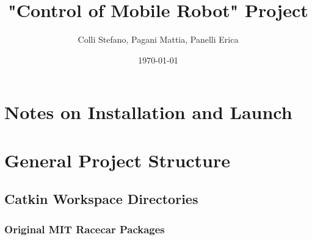 \documentclass[12pt, letterpaper, oneside]{report}
\title{"Control of Mobile Robot" Project}
\author{Colli Stefano, Pagani Mattia, Panelli Erica}
\date{\today}
\begin{document}
	
\maketitle

\begin{abstract}
\end{abstract}

\tableofcontents

\newpage

%

\chapter{Notes on Installation and Launch}

\chapter{General Project Structure}

\section{Catkin Workspace Directories}

\subsection{Original MIT Racecar Packages}
\end{document}
